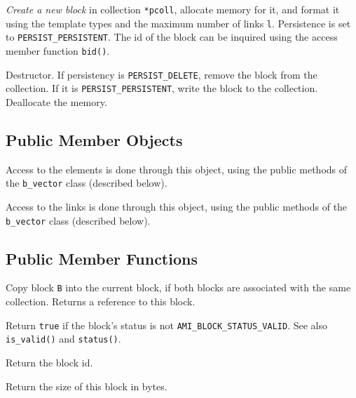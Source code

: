          {{\em
        Create a new block} in collection \lstinline|*pcoll|, allocate memory for
        it, and format it using the template types and the maximum number
        of links \lstinline|l|. Persistence is set to \lstinline|PERSIST_PERSISTENT|. The id of the block can be inquired using the
        access member function \lstinline|bid()|.}

         {Destructor. If persistency 
        is \lstinline|PERSIST_DELETE|, remove the block from the collection. 
        If it is \lstinline|PERSIST_PERSISTENT|, write the block to the 
        collection. Deallocate the memory.}

   \etabb

\subsection{Public Member Objects}

   \btabb

         {Access to the elements is done through
        this object, using the public methods of the \lstinline|b_vector| class
        (described below).}

         {Access to the links is done
        through this object, using the public methods of the \lstinline|b_vector| class (described below).}

   \etabb

\subsection{Public Member Functions}

   \btabb
        
         {Copy
        block \lstinline|B| into the current block, if both blocks are associated
        with the same collection. Returns a reference to this block.}

         {Return \lstinline|true| if the block's status 
        is not \lstinline|AMI_BLOCK_STATUS_VALID|. See also \lstinline|is_valid()| and 
        \lstinline|status()|.}

         {Return the block id.}

         {Return the size of this block
        in bytes.}

